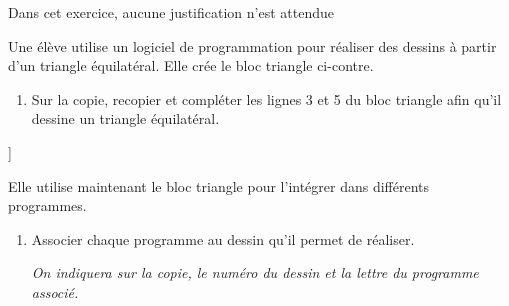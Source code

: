 \documentclass[exercice,a4]{thedocument}%
\begin{document}
%
\providecommand{\degres}{^\circ}%
Dans cet exercice, aucune justification n'est attendue

Une élève utilise un logiciel de programmation pour réaliser des dessins à partir d'un triangle équilatéral. Elle crée le bloc \og triangle \fg ci-contre.%

\medskip

\begin{minipage}{0.62\linewidth}
\begin{enumerate}
\item Sur la copie, recopier et compléter les lignes 3 et 5 du bloc \og triangle \fg{} afin qu'il dessine un triangle équilatéral.
\end{enumerate}
\end{minipage}\hfill
\begin{minipage}{0.30\linewidth}
\begin{scratch}[scale=0.8,num blocks, num start=1,baseline=2]]
{
}

\end{scratch}
\end{minipage}

\medskip

Elle utilise maintenant le bloc \og triangle \fg{} pour l'intégrer dans différents programmes.

\medskip

\begin{enumerate}[start=2]
\item Associer chaque programme au dessin qu'il permet de réaliser.

\emph{On indiquera sur la copie, le numéro du dessin et la lettre du programme associé.}
\end{enumerate}
\end{document}
